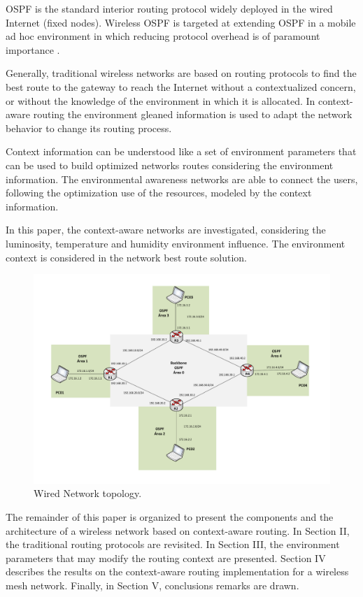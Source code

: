 OSPF is the standard interior routing protocol widely deployed in the wired Internet (fixed nodes). Wireless OSPF is targeted at extending OSPF in a mobile ad hoc environment in which reducing protocol overhead is of paramount importance \cite{Holter2010}.

Generally, traditional wireless networks are based on routing protocols to find the best route to the gateway to reach the Internet without a contextualized concern, or without the knowledge of the environment in which it is allocated. In context-aware routing the environment gleaned information is used to adapt the network behavior to change its routing process.

Context information can be understood like a set of environment parameters that can be used to build optimized networks routes considering the environment information. The environmental awareness networks are able to connect the users, following the optimization use of the resources, modeled by the context information.

In this paper, the context-aware networks are investigated, considering the luminosity, temperature and humidity environment influence. The environment context is considered in the network best route solution.

\begin{figure}[!t]
	\centering
	\includegraphics[width=\textwidth]{figs/topologia-2.pdf}
	\caption{Wired Network topology.}
	\label{Fig01}
\end{figure}

The remainder of this paper is organized to present the components and the architecture of a wireless network based on context-aware routing. In Section II, the traditional routing protocols are revisited. In Section III, the environment parameters that may modify the routing context are presented. Section IV describes the results on the context-aware routing implementation for a wireless mesh network. Finally, in Section V, conclusions remarks are drawn.